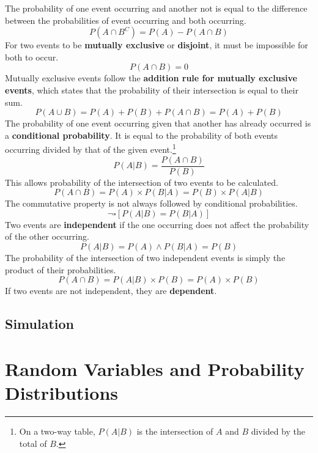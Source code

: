 \documentclass[../AP_Statistics.tex]{subfiles}
\begin{document}
		The probability of one event occurring and another not is equal to the difference between the probabilities of event occurring and both occurring.
		$$P\left(A\cap B^C\right) = P(A) - P(A\cap B)$$
		For two events to be \textbf{mutually exclusive} or \textbf{disjoint}, it must be impossible for both to occur.
		$$P(A\cap B) = 0$$
		Mutually exclusive events follow the \textbf{addition rule for mutually exclusive events}, which states that the probability of their intersection is equal to their sum.
		$$P(A\cup B) = P(A) + P(B) + P(A\cap B) = P(A) + P(B)$$
		The probability of one event occurring given that another has already occurred is a \textbf{conditional probability}. It is equal to the probability of both events occurring divided by that of the given event.\footnote{On a two-way table, $P(A|B)$ is the intersection of $A$ and $B$ divided by the total of $B$.}
		$$P(A|B) = \frac{P(A\cap B)}{P(B)}$$
		This allows probability of the intersection of two events to be calculated.
		$$P(A\cap B) = P(A) \times P(B|A) = P(B) \times P(A|B)$$
		The commutative property is not always followed by conditional probabilities.
		$$\lnot\square[P(A|B) = P(B|A)]$$
		Two events are \textbf{independent} if the one occurring does not affect the probability of the other occurring.
		$$P(A|B) = P(A) \land P(B|A) = P(B)$$
		The probability of the intersection of two independent events is simply the product of their probabilities.
		$$P(A\cap B) = P(A|B) \times P(B) = P(A) \times P(B)$$
		If two events are not independent, they are \textbf{dependent}.
		\section*{Simulation}
	\chapter{Random Variables and Probability Distributions}
\end{document}
